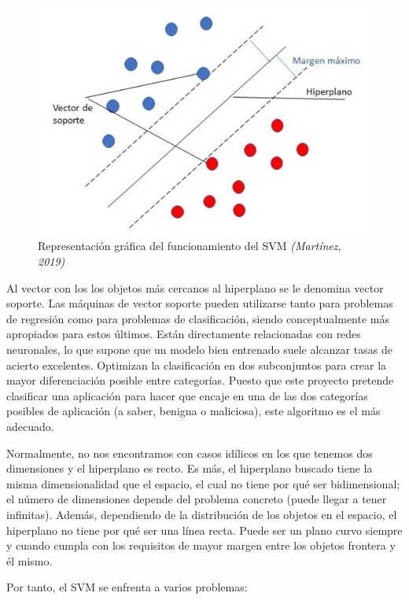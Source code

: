 \begin{figure}[]
\centering
	\includegraphics[scale=0.45]{img/svm.jpg}
	\caption{Representación gráfica del funcionamiento del SVM \textit{(Martínez, 2019)}}
	\label{fig:svm}
\end{figure}

Al vector con los los objetos más cercanos al hiperplano se le denomina vector soporte. Las máquinas de vector soporte pueden utilizarse tanto para problemas de regresión como para problemas de clasificación, siendo conceptualmente más apropiados para estos últimos. Están directamente relacionadas con redes neuronales, lo que supone que un modelo bien entrenado suele alcanzar tasas de acierto excelentes. Optimizan la clasificación en dos subconjuntos para crear la mayor diferenciación posible entre categorías. Puesto que este proyecto pretende clasificar una aplicación para hacer que encaje en una de las dos categorías posibles de aplicación (a saber, benigna o maliciosa), este algoritmo es el más adecuado.

Normalmente, no nos encontramos con casos idílicos en los que tenemos dos dimensiones y el hiperplano es recto. Es más, el hiperplano buscado tiene la misma dimensionalidad que el espacio, el cual no tiene por qué ser bidimensional; el número de dimensiones depende del problema concreto (puede llegar a tener infinitas). Además, dependiendo de la distribución de los objetos en el espacio, el hiperplano no tiene por qué ser una línea recta. Puede ser un plano curvo siempre y cuando cumpla con los requisitos de mayor margen entre los objetos frontera y él mismo.

Por tanto, el SVM se enfrenta a varios problemas:

